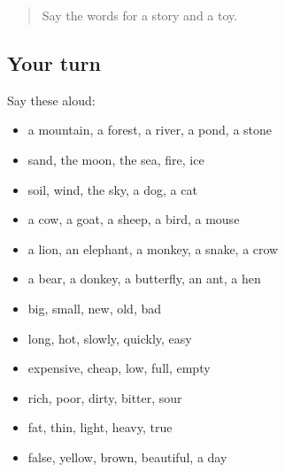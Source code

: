 \label{lesson:BN-R89-first-pass-school-nature-animals-and-describing-wor}



\begin{quote}
Say the words for a story and a toy.
\end{quote}

\subsection*{Your turn}
Say these aloud:

\begin{itemize}
\raggedright
  \item a mountain, a forest, a river, a pond, a stone
  \item sand, the moon, the sea, fire, ice
  \item soil, wind, the sky, a dog, a cat
  \item a cow, a goat, a sheep, a bird, a mouse
  \item a lion, an elephant, a monkey, a snake, a crow
  \item a bear, a donkey, a butterfly, an ant, a hen
  \item big, small, new, old, bad
  \item long, hot, slowly, quickly, easy
  \item expensive, cheap, low, full, empty
  \item rich, poor, dirty, bitter, sour
  \item fat, thin, light, heavy, true
  \item false, yellow, brown, beautiful, a day
\end{itemize}

